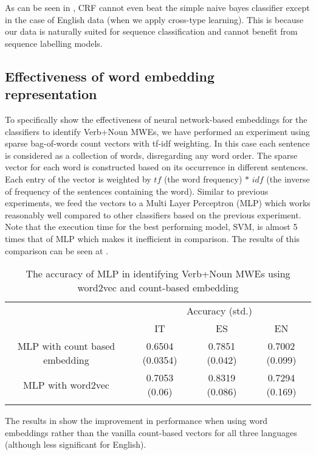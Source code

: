 \documentclass[output=paper
,modfonts
,nonflat]{langsci/langscibook}
\begin{document}
As can be seen in , CRF cannot even beat the simple naive bayes classifier except in the case of English data (when we apply cross-type learning). This is because our data is naturally suited for sequence classification and cannot benefit from sequence labelling models.

\subsection{Effectiveness of word embedding representation}
\label{s:wv-res}
To specifically show the effectiveness of neural network-based embeddings for the classifiers to identify Verb+Noun MWEs, we have performed an experiment using sparse bag-of-words count vectors with tf-idf weighting. In this case each sentence is considered as a collection of words, disregarding any word order. The sparse vector for each word is constructed based on its occurrence in different sentences. Each entry of the vector is weighted by $tf$ (the word frequency) $*$ $idf$ (the inverse of frequency of the sentences containing the word). Similar to previous experiments, we feed the vectors to a Multi Layer Perceptron (MLP) which works reasonably well compared to other classifiers based on the previous experiment. Note that the execution time for the best performing model, SVM, is almost 5 times that of MLP which makes it inefficient in comparison. The results of this comparison can be seen at .


\begin{table}[!ht]
\small
\caption{The accuracy of MLP in identifying Verb+Noun MWEs using word2vec and count-based embedding}
\label{tab:wv}
 \begin{tabular}{cccc}
  \lsptoprule
  & \multicolumn{3}{c}{Accuracy (std.)} \\
  & IT & ES & EN \\
  \midrule
  MLP with count based embedding & 0.6504 (0.0354) & 0.7851 (0.042)  & 0.7002 (0.099) \\
  MLP with word2vec & 0.7053 (0.06) &   0.8319 (0.086) & 0.7294 (0.169) \\
  \lspbottomrule
 \end{tabular}
\end{table}

The results in  show the improvement in performance when using word embeddings rather than the vanilla count-based vectors for all three languages (although less significant for English). 
 
\end{document}

